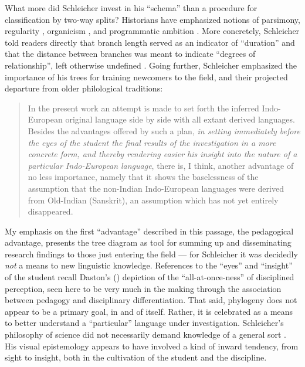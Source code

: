\documentclass[output=paper]{langscibook}
\begin{document}
What more did Schleicher invest in his ``schema'' than a procedure for classification by two-way splits? Historians have emphasized notions of parsimony, regularity \citep[117, 114--115]{GeislerList2013}, organicism \citep[56]{Wells1987}, and programmatic ambition \citep[755]{Koerner1975}. More concretely, Schleicher told readers directly that branch length served as an indicator of ``duration'' and that the distance between branches was meant to indicate ``degrees of relationship'', left otherwise undefined \citep[8]{Schleicher1853}. Going further, Schleicher emphasized the importance of his trees for training newcomers to the field, and their projected departure from older philological traditions:

\begin{quotation}
In the present work an attempt is made to set forth the inferred Indo-European original language side by side with all extant derived languages. Besides the advantages offered by such a plan, \emph{in setting immediately before the eyes of the student the final results of the investigation in a more concrete form, and thereby rendering easier his insight into the nature of a particular Indo-European language}, there is, I think, another advantage of no less importance, namely that it shows the baselessness of the assumption that the non-Indian Indo-European languages were derived from Old-Indian (Sanskrit), an assumption which has not yet entirely disappeared. \citep[94]{Schleicher196718612}
\end{quotation}

My emphasis on the first ``advantage'' described in this passage, the pedagogical advantage, presents the tree diagram as tool for summing up and disseminating research findings to those just entering the field — for Schleicher it was decidedly \emph{not} a means to new linguistic knowledge. References to the ``eyes'' and ``insight'' of the student recall Daston's (\citeyear{Daston2008}) depiction of the ``all-at-once-ness'' of disciplined perception, seen here to be very much in the making through the association between pedagogy and disciplinary differentiation. That said, phylogeny does not appear to be a primary goal, in and of itself. Rather, it is celebrated as a means to better understand a ``particular'' language under investigation. Schleicher's philosophy of science did not necessarily demand knowledge of a general sort \citep{Nyhart2012}. His visual epistemology appears to have involved a kind of inward tendency, from sight to insight, both in the cultivation of the student and the discipline.
\end{document}
